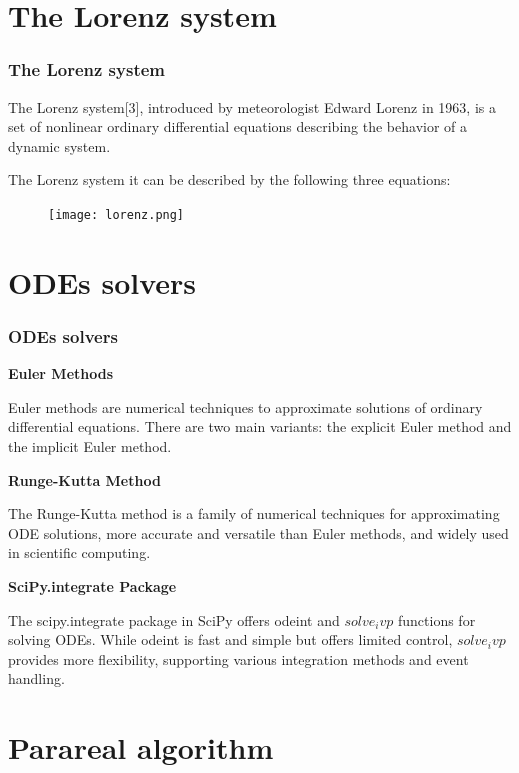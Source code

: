 \documentclass[
	11pt,
]{beamer}
\newcommand\myheading[1]{%
  \par\bigskip
  {\Large\bfseries#1}\par\smallskip}
\begin{document}
\section{The Lorenz system}

\begin{frame}
    \frametitle{The Lorenz system}
    The Lorenz system[3], introduced by meteorologist Edward Lorenz in 1963, is a set of nonlinear ordinary differential equations describing the behavior of a dynamic system.

 The Lorenz system it can be described by the following three equations:
        \begin{figure}
                \texttt{[image: lorenz.png]}
            \end{figure}
 
\end{frame}

\section{ODEs solvers}

\begin{frame}
    \frametitle{ODEs solvers}
	\myheading{Euler Methods} 
           Euler methods are numerical techniques to approximate solutions of ordinary differential equations. There are two main variants: the explicit Euler method and the implicit Euler method.
           
        \myheading{Runge-Kutta Method}
        The Runge-Kutta method is a family of numerical techniques for approximating ODE solutions, more accurate and versatile than Euler methods, and widely used in scientific computing.
        
        \myheading{SciPy.integrate Package}
        The scipy.integrate package in SciPy offers odeint and $solve_ivp$ functions for solving ODEs. While odeint is fast and simple but offers limited control, $solve_ivp$ provides more flexibility, supporting various integration methods and event handling.
\end{frame}


\section{Parareal algorithm}
\end{document}
